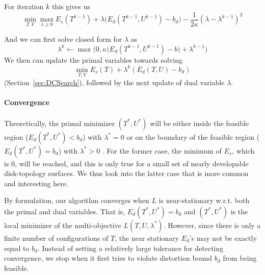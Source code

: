 For iteration $k$ this gives us 
\[ \min_{T,V} \max_{\lambda \geq 0} E_{s}(T^{k-1}) + \lambda \big( E_{d}(T^{k-1}, U^{k-1}) - b_d\big) - \frac{1}{2\kappa} (\lambda- \lambda^{k-1})^2 \]

And we can first solve closed form for $\lambda$ as
\[ \lambda^{k} \leftarrow \max\big(0,\kappa \big( E_{d}(T^{k-1}, U^{k-1}) -b \big) + \lambda^{k-1}\big) \]
%
We then can update the primal variables towards solving
\[ \min_{T,V}  E_{s}(T) + \lambda^{k}  (E_{d}(T, U) - b_d) \]
(Section~\ref{sec:DCSearch}), followed by the next update of dual variable $\lambda$.




\paragraph{Convergence}
Theoretically, the primal minimizer $(T^*, U^*)$ will be either inside the feasible region ($E_d(T^*, U^*) < b_d$) with $\lambda^* = 0$ or on the boundary of the feasible region ($E_d(T^*, U^*) = b_d$) with $\lambda^* > 0$ \cite{a computational optimization book}. For the former case, the minimum of $E_s$, which is $0$, will be reached, and this is only true for a small set of nearly developable disk-topology surfaces. We thus look into the latter case that is more common and interesting here.

By formulation, our algorithm converges when $L$ is near-stationary w.r.t. both the primal and dual variables. That is, $E_d(T^*, U^*) = b_d$ and $(T^*, U^*)$ is the local minimizer of the multi-objective $L(T,U,\lambda^*)$. However, since there is only a finite number of configurations of $T$, the near stationary $E_d$'s may not be exactly equal to $b_d$. Instead of setting a relatively large tolerance for detecting convergence, we stop when it first tries to violate distortion bound $b_d$ from being feasible.
